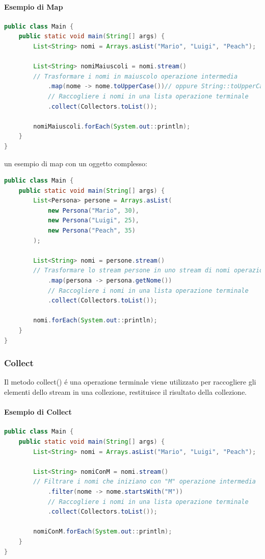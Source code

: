 \documentclass[11pt]{article}
\begin{document}
\paragraph{Esempio di Map}
\begin{lstlisting}[language=Java]
public class Main {
    public static void main(String[] args) {
        List<String> nomi = Arrays.asList("Mario", "Luigi", "Peach");

        List<String> nomiMaiuscoli = nomi.stream()
        // Trasformare i nomi in maiuscolo operazione intermedia
            .map(nome -> nome.toUpperCase())// oppure String::toUpperCase
            // Raccogliere i nomi in una lista operazione terminale
            .collect(Collectors.toList());

        nomiMaiuscoli.forEach(System.out::println);
    }
}
\end{lstlisting}
un esempio di map con un oggetto complesso:
\begin{lstlisting}[language=Java]
public class Main {
    public static void main(String[] args) {
        List<Persona> persone = Arrays.asList(
            new Persona("Mario", 30),
            new Persona("Luigi", 25),
            new Persona("Peach", 35)
        );

        List<String> nomi = persone.stream()
        // Trasformare lo stream persone in uno stream di nomi operazione intermedia
            .map(persona -> persona.getNome())
            // Raccogliere i nomi in una lista operazione terminale
            .collect(Collectors.toList());

        nomi.forEach(System.out::println);
    }
}
\end{lstlisting}
\subsubsection{Collect}
Il metodo collect() é una operazione terminale viene utilizzato per raccogliere gli elementi dello stream in una collezione, restituisce il risultato della collezione.
\paragraph{Esempio di Collect}
\begin{lstlisting}[language=Java]
public class Main {
    public static void main(String[] args) {
        List<String> nomi = Arrays.asList("Mario", "Luigi", "Peach");

        List<String> nomiConM = nomi.stream()
        // Filtrare i nomi che iniziano con "M" operazione intermedia
            .filter(nome -> nome.startsWith("M"))
            // Raccogliere i nomi in una lista operazione terminale
            .collect(Collectors.toList());

        nomiConM.forEach(System.out::println);
    }
}
\end{lstlisting}
\end{document}
